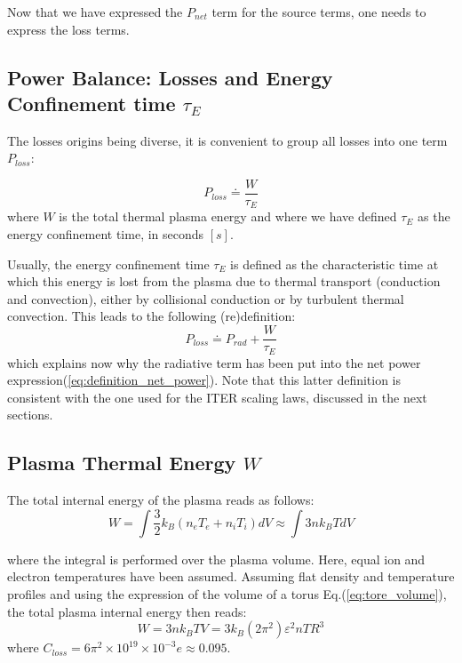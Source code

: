 Now that we have expressed the $P_{net}$ term for the source terms, one needs to express the loss terms.

\subsection{Power Balance: Losses and Energy Confinement time $\tau_E$}

The losses origins being diverse, it is convenient to group all losses into one term $P_{loss}$\cite[p.9]{Wesson2004}:

\begin{equation}
	P_{loss} 
	\doteq 
	\frac{ W }{ \tau_E } 
\label{eq:definition_confinement_time_global}
\end{equation}
\noindent
where $W$ is the total thermal plasma energy and where we have defined $\tau_E$ as the energy confinement time, in seconds $[\si{s}]$. 

Usually, the energy confinement time $\tau_E$ is defined as the characteristic time at which this energy is lost from the plasma due to thermal transport (conduction and convection), either by collisional conduction or by turbulent thermal convection. This leads to the following (re)definition\cite[(3.2)]{FusionCEA1987}:
\begin{equation}
	P_{loss} 
	\doteq 
	P_{rad}
	+
	\frac{ W }{ \tau_E } 
\label{eq:definition_confinement_time}
\end{equation}
\noindent
which explains now why the radiative term has been put into the net power expression(\ref{eq:definition_net_power}). Note that this latter definition is consistent with the one used for the ITER scaling laws, discussed in the next sections.


\subsection{Plasma Thermal Energy $W$}
The total internal energy of the plasma reads as follows:
\begin{equation*}
W  = \int \frac{3}{2} k_B \left( n_e T_e + n_i T_i \right ) dV 
\approx \int 3 n k_BT dV
\end{equation*}

\noindent
where the integral is performed over the plasma volume. Here, equal ion and electron temperatures have been assumed. Assuming flat density and temperature profiles and using the expression of the volume of a torus Eq.(\ref{eq:tore_volume}), the total plasma internal energy then reads:
\begin{equation}
W = 3 n k_B T V = 3 k_B (2\pi^2) \varepsilon^2  n T R^3
\label{eq:total_energy_natural_units}
\end{equation}
where $C_{loss} = 6\pi^2 \times 10^{19} \times 10^{-3}e \approx 0.095$.




